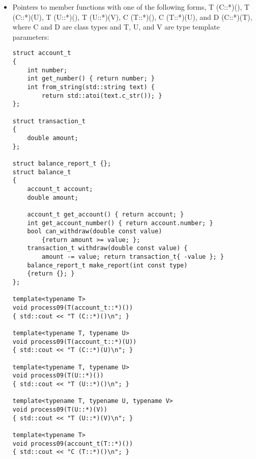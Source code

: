 \begin{itemize}
\begin{lstlisting}[style=styleCXX]
template<typename T>
void process08(T(*)()) { std::cout << "T (*)()\n"; }

template<typename T>
void process08(account_t(*)(T))
{ std::cout << "C (*) (T)\n"; }

template<typename T, typename U>
void process08(T(*)(U)) { std::cout << "T (*)(U)\n"; }

int main()
{
	account_t (*pf1)() = nullptr;
	account_t (*pf2)(int) = nullptr;
	double (*pf3)(int) = nullptr;
	
	process08(pf1); // T (*)()
	process08(pf2); // C (*)(T)
	process08(pf3); // T (*)(U)
}
\end{lstlisting}

\item
Pointers to member functions with one of the following forms, T (C::*)(), T (C::*)(U), T (U::*)(), T (U::*)(V), C (T::*)(), C (T::*)(U), and D (C::*)(T), where C and D are class types and T, U, and V are type template parameters:

\begin{lstlisting}[style=styleCXX]
struct account_t
{
	int number;
	int get_number() { return number; }
	int from_string(std::string text) {
		return std::atoi(text.c_str()); }
};

struct transaction_t
{
	double amount;
};

struct balance_report_t {};
struct balance_t
{
	account_t account;
	double amount;
	
	account_t get_account() { return account; }
	int get_account_number() { return account.number; }
	bool can_withdraw(double const value)
		{return amount >= value; };
	transaction_t withdraw(double const value) {
		amount -= value; return transaction_t{ -value }; }
	balance_report_t make_report(int const type)
	{return {}; }
};

template<typename T>
void process09(T(account_t::*)())
{ std::cout << "T (C::*)()\n"; }

template<typename T, typename U>
void process09(T(account_t::*)(U))
{ std::cout << "T (C::*)(U)\n"; }

template<typename T, typename U>
void process09(T(U::*)())
{ std::cout << "T (U::*)()\n"; }

template<typename T, typename U, typename V>
void process09(T(U::*)(V))
{ std::cout << "T (U::*)(V)\n"; }

template<typename T>
void process09(account_t(T::*)())
{ std::cout << "C (T::*)()\n"; }


\end{lstlisting}
\end{itemize}
